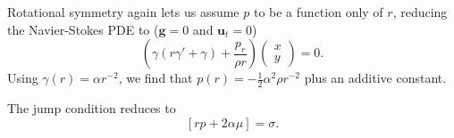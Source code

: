 \documentclass{article}
\newcommand{\uu}{\mathbf{u}}
\renewcommand{\gg}{\mathbf{g}}
\renewcommand{\uu}{\mathbf{u}}
\newcommand{\mx}[1]{\begin{pmatrix} #1 \end{pmatrix}}
\begin{document}
Rotational symmetry again lets us assume $p$ to be a function only of $r$, reducing the Navier-Stokes PDE to ($\gg = 0$ and $\uu_t = 0$)
$$ \left( \gamma \left( r \gamma' + \gamma \right) + \frac{p_r}{\rho r} \right) \mx{x \\ y} = 0. $$
Using $\gamma(r) = \alpha r^{-2}$, we find that $p(r) = -\frac{1}{2} \alpha^2 \rho r^{-2}$ plus an additive constant.

The jump condition reduces to
$$ \left[ r p + 2 \alpha \mu \right] = \sigma. $$
\end{document}
